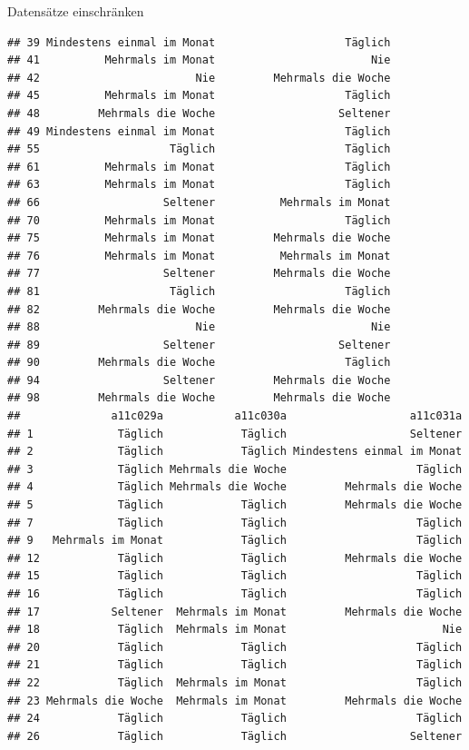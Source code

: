 \documentclass[ignorenonframetext,]{beamer}
\begin{document}
\begin{frame}[fragile]{Datensätze einschränken}
\begin{verbatim}
## 39 Mindestens einmal im Monat                    Täglich
## 41          Mehrmals im Monat                        Nie
## 42                        Nie         Mehrmals die Woche
## 45          Mehrmals im Monat                    Täglich
## 48         Mehrmals die Woche                   Seltener
## 49 Mindestens einmal im Monat                    Täglich
## 55                    Täglich                    Täglich
## 61          Mehrmals im Monat                    Täglich
## 63          Mehrmals im Monat                    Täglich
## 66                   Seltener          Mehrmals im Monat
## 70          Mehrmals im Monat                    Täglich
## 75          Mehrmals im Monat         Mehrmals die Woche
## 76          Mehrmals im Monat          Mehrmals im Monat
## 77                   Seltener         Mehrmals die Woche
## 81                    Täglich                    Täglich
## 82         Mehrmals die Woche         Mehrmals die Woche
## 88                        Nie                        Nie
## 89                   Seltener                   Seltener
## 90         Mehrmals die Woche                    Täglich
## 94                   Seltener         Mehrmals die Woche
## 98         Mehrmals die Woche         Mehrmals die Woche
##              a11c029a           a11c030a                   a11c031a
## 1             Täglich            Täglich                   Seltener
## 2             Täglich            Täglich Mindestens einmal im Monat
## 3             Täglich Mehrmals die Woche                    Täglich
## 4             Täglich Mehrmals die Woche         Mehrmals die Woche
## 5             Täglich            Täglich         Mehrmals die Woche
## 7             Täglich            Täglich                    Täglich
## 9   Mehrmals im Monat            Täglich                    Täglich
## 12            Täglich            Täglich         Mehrmals die Woche
## 15            Täglich            Täglich                    Täglich
## 16            Täglich            Täglich                    Täglich
## 17           Seltener  Mehrmals im Monat         Mehrmals die Woche
## 18            Täglich  Mehrmals im Monat                        Nie
## 20            Täglich            Täglich                    Täglich
## 21            Täglich            Täglich                    Täglich
## 22            Täglich  Mehrmals im Monat                    Täglich
## 23 Mehrmals die Woche  Mehrmals im Monat         Mehrmals die Woche
## 24            Täglich            Täglich                    Täglich
## 26            Täglich            Täglich                   Seltener

\end{verbatim}
\end{frame}
\end{document}
